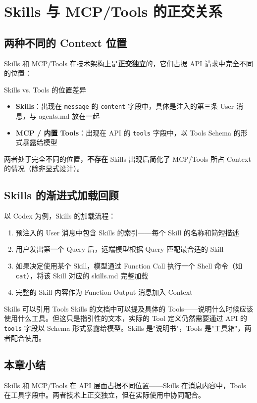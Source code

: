 \section{Skills 与 MCP/Tools 的正交关系}

\subsection{两种不同的 Context 位置}

Skills 和 MCP/Tools 在技术架构上是\textbf{正交独立}的，它们占据 API 请求中完全不同的位置：

\begin{importantbox}{Skills vs. Tools 的位置差异}
\begin{itemize}
    \item \textbf{Skills}：出现在 \texttt{message} 的 \texttt{content} 字段中，具体是注入的第三条 User 消息，与 agents.md 放在一起
    \item \textbf{MCP / 内置 Tools}：出现在 API 的 \texttt{tools} 字段中，以 Tools Schema 的形式暴露给模型
\end{itemize}
两者处于完全不同的位置，\textbf{不存在} Skills 出现后简化了 MCP/Tools 所占 Context 的情况（除非显式设计）。
\end{importantbox}

\subsection{Skills 的渐进式加载回顾}

以 Codex 为例，Skills 的加载流程：

\begin{enumerate}
    \item 预注入的 User 消息中包含 Skills 的索引——每个 Skill 的名称和简短描述
    \item 用户发出第一个 Query 后，远端模型根据 Query 匹配最合适的 Skill
    \item 如果决定使用某个 Skill，模型通过 Function Call 执行一个 Shell 命令（如 \texttt{cat}），将该 Skill 对应的 skills.md 完整加载
    \item 完整的 Skill 内容作为 Function Output 消息加入 Context
\end{enumerate}

\begin{knowledgebox}{Skills 可以引用 Tools}
Skills 的文档中可以提及具体的 Tools——说明什么时候应该使用什么工具。但这只是指引性的文本，实际的 Tool 定义仍然需要通过 API 的 \texttt{tools} 字段以 Schema 形式暴露给模型。Skills 是"说明书"，Tools 是"工具箱"，两者配合使用。
\end{knowledgebox}

\subsection{本章小结}

Skills 和 MCP/Tools 在 API 层面占据不同位置——Skills 在消息内容中，Tools 在工具字段中。两者技术上正交独立，但在实际使用中协同配合。


